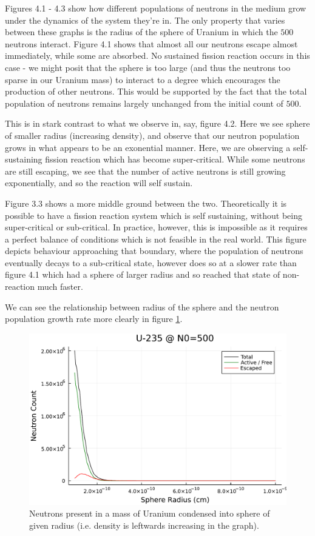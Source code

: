 Figures 4.1 - 4.3 show how different populations of neutrons in the medium grow under the dynamics of the system they're in. The only 
property that varies between these graphs is the radius of the sphere of Uranium in which the $500$ neutrons interact. Figure 
4.1 shows that almost all our neutrons escape almost immediately, while some are absorbed. No sustained fission reaction 
occurs in this case - we might posit that the sphere is too large (and thus the neutrons too sparse in our Uranium mass) to 
interact to a degree which encourages the production of other neutrons. This would be supported by the fact that the total population 
of neutrons remains largely unchanged from the initial count of $500$. 

This is in stark contrast to what we observe in, say, figure 4.2. Here we see sphere of smaller radius (increasing density),
and observe that our neutron population grows in what appears to be an exonential manner. Here, we are observing a self-sustaining 
fission reaction which has become super-critical. While some neutrons are still escaping, we see that the number of active neutrons 
is still growing exponentially, and so the reaction will self sustain. 

Figure 3.3 shows a more middle ground between the two. Theoretically it is possible to have a fission reaction system which is self sustaining,
without being super-critical or sub-critical. In practice, however, this is impossible as it requires a perfect balance of conditions which 
is not feasible in the real world. This figure depicts behaviour approaching that boundary, where the population of neutrons eventually decays 
to a sub-critical state, however does so at a slower rate than figure 4.1 which had a sphere of larger radius and so reached that state of 
non-reaction much faster.

We can see the relationship between radius of the sphere and the neutron population growth rate more clearly in figure \ref{uranium-total}. 

\begin{figure}[h!]
    \centering
    \includegraphics[scale=0.55]{imgs/radius-variation-uranium.pdf}
    \caption{Neutrons present in a mass of Uranium condensed into sphere of given radius (i.e. density is leftwards increasing in 
    the graph).}
    \label{uranium-total}
\end{figure}

